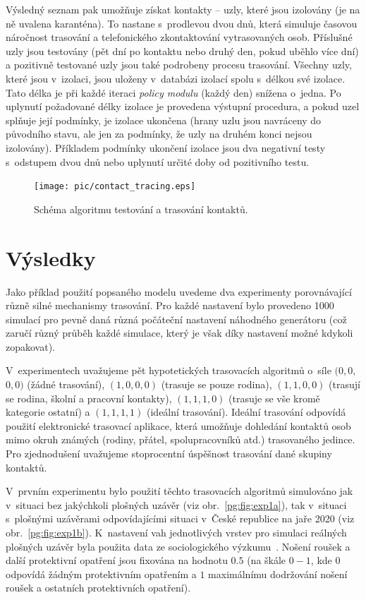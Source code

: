 Výsledný seznam pak umožňuje získat kontakty -- uzly, které jsou izolovány (je na
ně uvalena karanténa). To nastane s~prodlevou dvou dnů, která simuluje časovou
náročnost trasování a telefonického zkontaktování vytrasovaných osob.
Příslušné uzly jsou testovány (pět dní po kontaktu nebo druhý den, pokud uběhlo
více dní) a pozitivně testované uzly jsou také podrobeny procesu trasování. 
Všechny uzly, které jsou v~izolaci, jsou uloženy v~databázi izolací spolu s~délkou
své izolace. Tato délka je při každé iteraci {\em policy modulu} (každý den)
snížena o~jedna. Po uplynutí požadované délky izolace je provedena výstupní
procedura, a pokud uzel splňuje její podmínky, je izolace ukončena (hrany uzlu
jsou navráceny do původního stavu, ale jen za podmínky, že uzly na druhém konci
nejsou izolovány). Příkladem podmínky ukončení izolace jsou dva negativní testy
s~odstupem dvou dnů nebo uplynutí určité doby od pozitivního testu.


\begin{figure}[ht]
  \centering \texttt{[image: pic/contact\_tracing.eps]}
  \caption{Schéma algoritmu testování a trasování kontaktů.}
  \label{pg:fig:ct}
\end{figure}




\section*{Výsledky}
Jako příklad použití popsaného modelu uvedeme dva experimenty porovnávající
různě silné mechanismy trasování. Pro každé nastavení bylo provedeno 1000
simulací pro pevně daná různá počáteční nastavení náhodného
generátoru (což zaručí různý průběh každé simulace, který je však díky nastavení možné kdykoli zopakovat).

V~experimentech uvažujeme pět hypotetických trasovacích algoritmů
o~sí\-le $(0, 0,$ $ 0, 0)$ (žádné trasování), $(1, 0, 0, 0)$ (trasuje se
pouze rodina), $(1, 1, 0, 0)$ (trasují se rodina, školní a pracovní
kontakty), $(1, 1, 1, 0)$ (trasuje se vše kromě kategorie ostatní) a
$(1, 1, 1, 1)$ (ideální trasování). Ideální trasování odpovídá použití
elektronické trasovací aplikace, která umožňuje dohledání kontaktů
osob mimo okruh známých (rodiny, přátel, spolupracovníků atd.) trasovaného jedince. Pro zjednodušení
uvažujeme stoprocentní úspěšnost trasování dané skupiny kontaktů.

V~prvním experimentu bylo použití těchto trasovacích algoritmů
simulováno jak v~situaci bez jakýchkoli plošných uzávěr (viz
obr.~\ref{pg:fig:exp1a}), tak v~situaci s~plošnými uzávěrami
odpovídajícími situaci v~České republice na jaře 2020 (viz
obr.~\ref{pg:fig:exp1b}). K~nastavení vah jednotlivých vrstev pro
simulaci reálných plošných uzávěr byla použita data ze sociologického
výzkumu~\cite{paqcovid}. Nošení roušek a další protektivní opatření
jsou fixována na hodnotu $0.5$ (na škále $0 - 1$, kde $0$ odpovídá
žádným protektivním opatřením a $1$ maximálnímu dodržování nošení
roušek a ostatních protektivních opatření).

